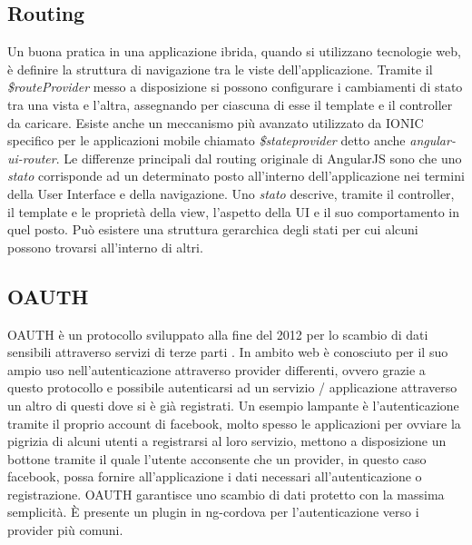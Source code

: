 \subsection{Routing}
Un buona pratica in una applicazione ibrida, quando si utilizzano tecnologie web, è definire la struttura di navigazione tra le viste dell'applicazione. Tramite il \emph{\$routeProvider} messo a disposizione si possono configurare i cambiamenti di stato tra una vista e l'altra, assegnando per ciascuna di esse il template e il controller da caricare. Esiste anche un meccanismo più avanzato utilizzato da IONIC specifico per le applicazioni mobile chiamato \emph{\$stateprovider} detto anche \emph{angular-ui-router}. Le differenze principali dal routing originale di AngularJS sono che uno \textit{stato} corrisponde ad un determinato posto all'interno dell'applicazione nei termini della User Interface e della navigazione. Uno \textit{stato} descrive, tramite il controller, il template e le proprietà della view, l'aspetto della UI e il suo comportamento in quel posto. Può esistere una struttura gerarchica degli stati per cui alcuni possono trovarsi all'interno di altri. \citep{angularjs:ui-router} 

\subsection{OAUTH}
OAUTH è un protocollo sviluppato alla fine del 2012 per lo scambio di dati sensibili attraverso servizi di terze parti \citep{rfc:oauth}. In ambito web è conosciuto per il suo ampio uso nell'autenticazione attraverso provider differenti, ovvero grazie a questo protocollo e possibile autenticarsi ad un servizio / applicazione attraverso un altro di questi dove si è già registrati. Un esempio lampante è l'autenticazione tramite il proprio account di facebook, molto spesso le applicazioni per ovviare la pigrizia di alcuni utenti a registrarsi al loro servizio, mettono a disposizione un bottone tramite il quale l'utente acconsente che un provider, in questo caso facebook, possa fornire all'applicazione i dati necessari all'autenticazione o registrazione.
OAUTH garantisce uno scambio di dati protetto con la massima semplicità. È presente un plugin in ng-cordova per l'autenticazione verso i provider più comuni.
